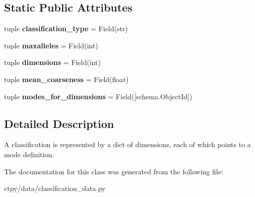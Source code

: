 \subsection*{Static Public Attributes}
\begin{DoxyCompactItemize}
\item 
\hypertarget{classctpy_1_1data_1_1classification__data_1_1_classification_data_a0faebdc46a56568dce1bfdd7dbff188b}{tuple {\bfseries classification\-\_\-type} = Field(str)}\label{classctpy_1_1data_1_1classification__data_1_1_classification_data_a0faebdc46a56568dce1bfdd7dbff188b}

\item 
\hypertarget{classctpy_1_1data_1_1classification__data_1_1_classification_data_aad96024b8c65db43ed3618d2c01635b1}{tuple {\bfseries maxalleles} = Field(int)}\label{classctpy_1_1data_1_1classification__data_1_1_classification_data_aad96024b8c65db43ed3618d2c01635b1}

\item 
\hypertarget{classctpy_1_1data_1_1classification__data_1_1_classification_data_a07d5db6b6a8228083bc1ee38eb1de9fc}{tuple {\bfseries dimensions} = Field(int)}\label{classctpy_1_1data_1_1classification__data_1_1_classification_data_a07d5db6b6a8228083bc1ee38eb1de9fc}

\item 
\hypertarget{classctpy_1_1data_1_1classification__data_1_1_classification_data_a336bd7d4b008d108b8c08a7f6ce1cb0d}{tuple {\bfseries mean\-\_\-coarseness} = Field(float)}\label{classctpy_1_1data_1_1classification__data_1_1_classification_data_a336bd7d4b008d108b8c08a7f6ce1cb0d}

\item 
\hypertarget{classctpy_1_1data_1_1classification__data_1_1_classification_data_a5ddfc6b558a9ccd262f795cbed1a6bdb}{tuple {\bfseries modes\-\_\-for\-\_\-dimensions} = Field(\mbox{[}schema.\-Object\-Id\mbox{]})}\label{classctpy_1_1data_1_1classification__data_1_1_classification_data_a5ddfc6b558a9ccd262f795cbed1a6bdb}

\end{DoxyCompactItemize}


\subsection{Detailed Description}
A classification is represented by a dict of dimensions, each of which points to a mode definition. 



The documentation for this class was generated from the following file\-:\begin{DoxyCompactItemize}
\item 
ctpy/data/classification\-\_\-data.\-py\end{DoxyCompactItemize}

